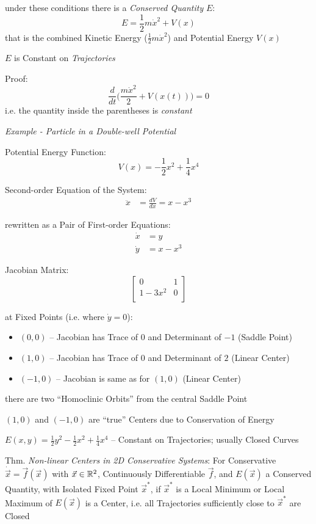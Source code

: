 under these conditions there is a \emph{Conserved Quantity} $E$:
\[
  E = \frac{1}{2}m\dot{x}^2 + V(x)
\]
that is the combined Kinetic Energy ($\frac{1}{2}m\dot{x}^2$) and Potential
Energy $V(x)$

$E$ is Constant on \emph{Trajectories}

Proof:
\[
  \frac{d}{dt}\Big(\frac{m\dot{x}^2}{2} + V(x(t))\Big) = 0
\]
i.e. the quantity inside the parentheses is \emph{constant}


\emph{Example - Particle in a Double-well Potential}

Potential Energy Function:
\[
  V(x) = -\frac{1}{2}x^2 + \frac{1}{4}x^4
\]

Second-order Equation of the System:
\begin{align*}
  \ddot{x} & = \frac{dV}{dx} = x - x^3
\end{align*}

rewritten as a Pair of First-order Equations:
\begin{align*}
  \dot{x} & = y \\
  \dot{y} & = x - x^3
\end{align*}

Jacobian Matrix:
\[
  \begin{bmatrix}
    0        & 1 \\
    1 - 3x^2 & 0 \\
  \end{bmatrix}
\]

at Fixed Points (i.e. where $\dot{y} = 0$):
\begin{itemize}
  \item $(0,0)$ -- Jacobian has Trace of $0$ and Determinant of $-1$ (Saddle
    Point)
  \item $(1,0)$ -- Jacobian has Trace of $0$ and Determinant of $2$ (Linear
    Center)
  \item $(-1,0)$ -- Jacobian is same as for $(1,0)$ (Linear Center)
\end{itemize}

there are two ``Homoclinic Orbits'' from the central Saddle Point

$(1,0)$ and $(-1,0)$ are ``true'' Centers due to Conservation of Energy

$E(x,y) = \frac{1}{2}y^2 - \frac{1}{2}x^2 + \frac{1}{4}x^4$ -- Constant on
Trajectories; usually Closed Curves


Thm. \emph{Non-linear Centers in 2D Conservative Systems}:
For Conservative $\dot{\vec{x}} = \vec{f}(\vec{x})$ with $\vec{x} \in
\mathbb{R}^2$, Continuously Differentiable $\vec{f}$, and $E(\vec{x})$ a Conserved
Quantity, with Isolated Fixed Point $\vec{x}^*$, if $\vec{x}^*$ is a Local
Minimum or Local Maximum of $E(\vec{x})$ is a Center, i.e. all Trajectories
sufficiently close to $\vec{x}^*$ are Closed


